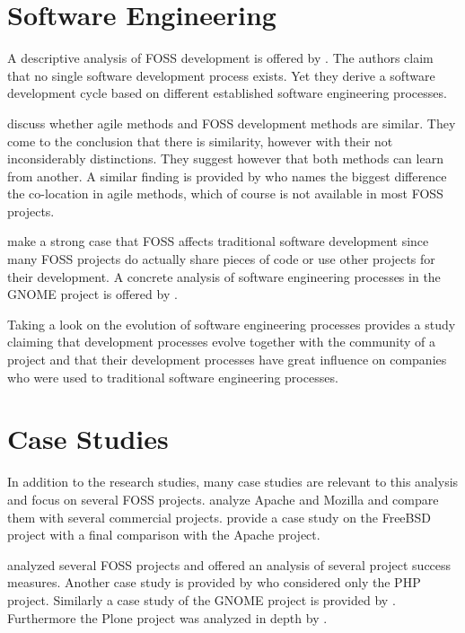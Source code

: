 
\section{Software Engineering} %

A descriptive analysis of \ac{FOSS} development is offered by
\textcite{Roets2007}. The authors claim that no single software development
process exists. Yet they derive a software development cycle based on different
established software engineering processes.

\textcite{Warsta2003} discuss whether agile methods and \ac{FOSS} development
methods are similar. They come to the conclusion that there is similarity,
however with their not inconsiderably distinctions. They suggest however that
both methods can learn from another. A similar finding is provided by
\textcite{Koch2004} who names the biggest difference the co-location in agile
methods, which of course is not available in most \ac{FOSS} projects.

\textcite{Spinellis2004} make a strong case that \ac{FOSS} affects traditional
software development since many \ac{FOSS} projects do actually share pieces of
code or use other projects for their development. A concrete analysis of
software engineering processes in the GNOME project is offered by
\textcite{German2003}.

Taking a look on the evolution of software engineering processes
\textcite{Scacchi2006} provides a study claiming that development processes
evolve together with the community of a project and that their development
processes have great influence on companies who were used to traditional
software engineering processes.


\section{Case Studies} %

In addition to the research studies, many case studies are relevant to this
analysis and focus on several \ac{FOSS} projects. \textcite{Mockus2002} analyze
Apache and Mozilla and compare them with several commercial projects.
\textcite{Dinh-Trong2004} provide a case study on the FreeBSD project with a
final comparison with the Apache project.

\textcite{Crowston2004} analyzed several \ac{FOSS} projects and offered an
analysis of several project success measures. Another case study is provided by
\textcite{Magnusson2010} who considered only the PHP project. Similarly a case
study of the GNOME project is provided by \textcite{Koch2002}. Furthermore the
Plone project was analyzed in depth by \textcite{Aspeli2005}.

